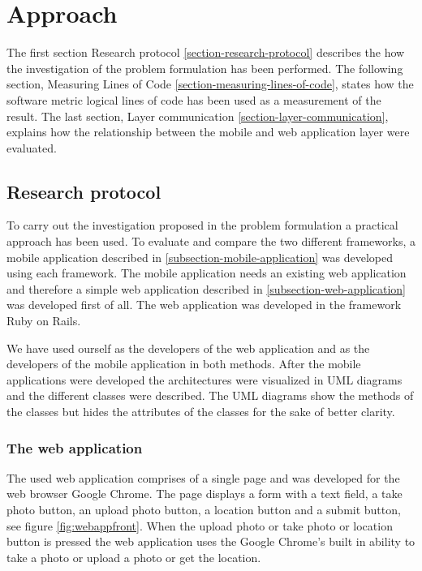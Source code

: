 \chapter{Approach} \label{ch:approach}
The first section Research protocol \ref{section-research-protocol} describes the how the investigation of the problem formulation has been performed. The following section, Measuring Lines of Code \ref{section-measuring-lines-of-code}, states how the software metric logical lines of code has been used as a measurement of the result. The last section, Layer communication \ref{section-layer-communication}, explains how the relationship between the mobile and web application layer were evaluated. 


\section{Research protocol} \label{sec:research-protocol}
To carry out the investigation proposed in the problem formulation a practical approach has been used. To evaluate and compare the two different frameworks, a mobile application described in \ref{subsection-mobile-application} was developed using each framework. The mobile application needs an existing web application and therefore a simple web application described in \ref{subsection-web-application} was developed first of all. The web application was developed in the framework Ruby on Rails.

We have used ourself as the developers of the web application and as the developers of the mobile application in both methods. After the mobile applications were developed the architectures were visualized in UML diagrams and the different classes were described. The UML diagrams show the methods of the classes but hides the attributes of the classes for the sake of better clarity. 

\subsection{The web application} \label{subsec:the-web-application}
The used web application comprises of a single page and was developed for the web browser Google Chrome. The page displays a form with a text field, a take photo button, an upload photo button, a location button and a submit button, see figure \ref{fig:webappfront}. When the upload photo or take photo or location button is pressed the web application uses the Google Chrome’s built in ability to take a photo or upload a photo or get the location.

